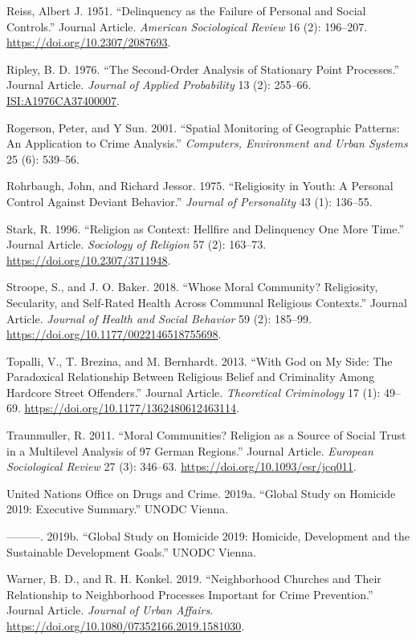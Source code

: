 \documentclass[smallextended]{svjour3}       %
\begin{document}
\leavevmode\hypertarget{ref-Reiss1951delinquency}{}%
Reiss, Albert J. 1951. ``Delinquency as the Failure of Personal and
Social Controls.'' Journal Article. \emph{American Sociological Review}
16 (2): 196--207. \url{https://doi.org/10.2307/2087693}.

\leavevmode\hypertarget{ref-Ripley1976second}{}%
Ripley, B. D. 1976. ``The Second-Order Analysis of Stationary Point
Processes.'' Journal Article. \emph{Journal of Applied Probability} 13
(2): 255--66. \url{ISI:A1976CA37400007}.

\leavevmode\hypertarget{ref-Rogerson2001spatial}{}%
Rogerson, Peter, and Y Sun. 2001. ``Spatial Monitoring of Geographic
Patterns: An Application to Crime Analysis.'' \emph{Computers,
Environment and Urban Systems} 25 (6): 539--56.

\leavevmode\hypertarget{ref-Rohrbaugh1975religiosity}{}%
Rohrbaugh, John, and Richard Jessor. 1975. ``Religiosity in Youth: A
Personal Control Against Deviant Behavior.'' \emph{Journal of
Personality} 43 (1): 136--55.

\leavevmode\hypertarget{ref-Stark1996religion}{}%
Stark, R. 1996. ``Religion as Context: Hellfire and Delinquency One More
Time.'' Journal Article. \emph{Sociology of Religion} 57 (2): 163--73.
\url{https://doi.org/10.2307/3711948}.

\leavevmode\hypertarget{ref-Stroope2018moral}{}%
Stroope, S., and J. O. Baker. 2018. ``Whose Moral Community?
Religiosity, Secularity, and Self-Rated Health Across Communal Religious
Contexts.'' Journal Article. \emph{Journal of Health and Social
Behavior} 59 (2): 185--99.
\url{https://doi.org/10.1177/0022146518755698}.

\leavevmode\hypertarget{ref-Topalli2013god}{}%
Topalli, V., T. Brezina, and M. Bernhardt. 2013. ``With God on My Side:
The Paradoxical Relationship Between Religious Belief and Criminality
Among Hardcore Street Offenders.'' Journal Article. \emph{Theoretical
Criminology} 17 (1): 49--69.
\url{https://doi.org/10.1177/1362480612463114}.

\leavevmode\hypertarget{ref-Traunmuller2011moral}{}%
Traunmuller, R. 2011. ``Moral Communities? Religion as a Source of
Social Trust in a Multilevel Analysis of 97 German Regions.'' Journal
Article. \emph{European Sociological Review} 27 (3): 346--63.
\url{https://doi.org/10.1093/esr/jcq011}.

\leavevmode\hypertarget{ref-Unodc2019executive}{}%
United Nations Office on Drugs and Crime. 2019a. ``Global Study on
Homicide 2019: Executive Summary.'' UNODC Vienna.

\leavevmode\hypertarget{ref-Unodc2019development}{}%
---------. 2019b. ``Global Study on Homicide 2019: Homicide, Development
and the Sustainable Development Goals.'' UNODC Vienna.

\leavevmode\hypertarget{ref-Warner2019neighborhood}{}%
Warner, B. D., and R. H. Konkel. 2019. ``Neighborhood Churches and Their
Relationship to Neighborhood Processes Important for Crime Prevention.''
Journal Article. \emph{Journal of Urban Affairs}.
\url{https://doi.org/10.1080/07352166.2019.1581030}.



\end{document}
